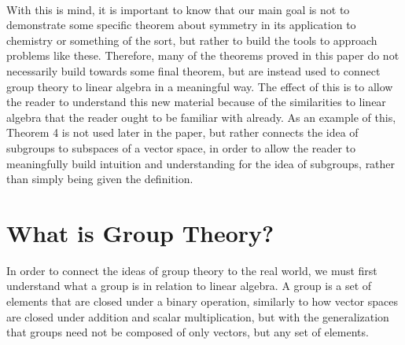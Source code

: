 \documentclass[twoside]{article}
\begin{document}
\begin{spacing}{1.25}
\paragraph*{} With this is mind, it is important to know that
our main goal is not to demonstrate some specific theorem about symmetry in its application to chemistry or something
of the sort, but rather to build the tools to approach problems like these. Therefore, many of the theorems proved
in this paper do not necessarily build towards some final
theorem, but are instead used to connect group theory to
linear algebra in a meaningful way. The effect of this
is to allow the reader to understand this new material 
because of the similarities to linear algebra that the reader ought to be familiar with already. As an example of this, Theorem 4 is not used later in the paper, but rather 
connects the idea of subgroups to subspaces of a vector space,
in order to allow the reader to meaningfully build intuition
and understanding for the idea of subgroups, rather than
simply being given the definition. 

\section{What is Group Theory?}

In order to connect the ideas of group theory to the real world, we must first understand what a group is 
in relation to linear algebra. A group is a set of elements that are closed under a binary operation,
similarly to how vector spaces are closed under addition and scalar multiplication, but with the 
generalization that groups need not be composed of only vectors, but any set of elements.


\end{spacing}
\end{document}
